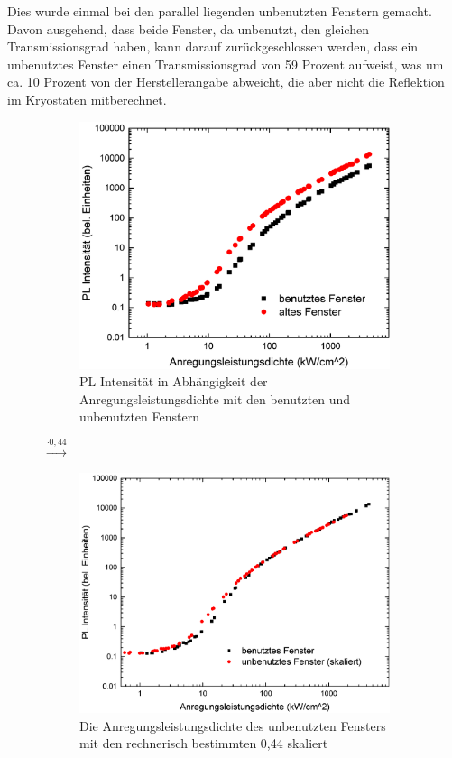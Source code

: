 Dies wurde einmal bei den parallel liegenden unbenutzten Fenstern gemacht. Davon ausgehend, dass beide Fenster, da unbenutzt, den gleichen Transmissionsgrad haben, kann darauf zurückgeschlossen werden, dass ein unbenutztes Fenster einen Transmissionsgrad von 59 Prozent aufweist, was um ca. 10 Prozent von der Herstellerangabe abweicht, die aber nicht die Reflektion im Kryostaten mitberechnet. 
%
\begin{figure}[htb]
  \centering
  \begin{subfigure}{0.40\textwidth}
    \centering
    \includegraphics[width=0.9\linewidth]{Bilder/uvsilicavergleich.pdf}
    \caption{PL Intensität in Abhängigkeit der Anregungsleistungsdichte mit den benutzten und unbenutzten Fenstern}
    \label{fig:sub1}
  \end{subfigure}%
  {\LARGE$\xrightarrow{\cdot 0,44}$}
  \begin{subfigure}{0.40\textwidth}
    \centering
    \includegraphics[width=0.9\linewidth]{Bilder/uvsilicaVergleichSkaliert.pdf}
    \caption{Die Anregungsleistungsdichte des unbenutzten Fensters mit den rechnerisch bestimmten 0,44 skaliert}
    \label{fig:sub2}
  \end{subfigure}
  \caption{}
  \label{fig:vergleichSkaliert}
\end{figure}
